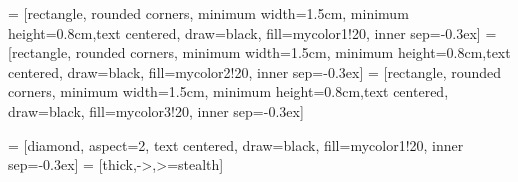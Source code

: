 
\usetikzlibrary{decorations.pathreplacing}
\linespread{0.6}
 = [rectangle, rounded corners, minimum width=1.5cm, minimum height=0.8cm,text centered, draw=black, fill=mycolor1!20, inner sep=-0.3ex]
 = [rectangle, rounded corners, minimum width=1.5cm, minimum height=0.8cm,text centered, draw=black, fill=mycolor2!20, inner sep=-0.3ex]
 = [rectangle, rounded corners, minimum width=1.5cm, minimum height=0.8cm,text centered, draw=black, fill=mycolor3!20, inner sep=-0.3ex]

 = [diamond, aspect=2,  text centered, draw=black, fill=mycolor1!20, inner sep=-0.3ex]
 = [thick,->,>=stealth]

